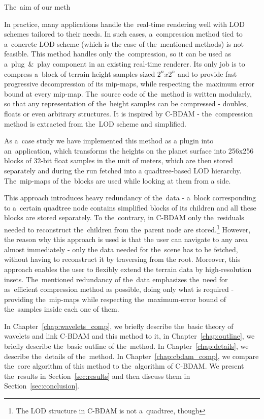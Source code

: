 The~aim of our meth

In practice, many applications handle the~real-time rendering well with LOD schemes tailored to their needs. In such cases, a~compression method tied to a~concrete LOD scheme (which is the case of the~mentioned methods) is not feasible. This method handles only the~compression, so it can be used as a~plug~\&~play component in an existing real-time renderer. Its only job is to compress a~block of terrain height samples sized $2^n x 2^n$ and to provide fast progressive decompression of its mip-maps, while respecting the~maximum error bound at every mip-map. The~source code of the~method is written modularly, so that any representation of the~height samples can be compressed - doubles, floats or even arbitrary structures. It is inspired by C-BDAM - the~compression method is extracted from the~LOD scheme and simplified.

As a~case study we have implemented this method as a plugin into an~application, which transforms the heights on the planet surface into 256x256 blocks of 32-bit float samples in the unit of meters, which are then stored separately and during the run fetched into a quadtree-based LOD hierarchy. The~mip-maps of the~blocks are used while looking at them from a side.

This approach introduces heavy redundancy of the~data - a~block corresponding to a~certain quadtree node contains simplified blocks of its children and all these blocks are stored separately. To the~contrary, in C-BDAM only the~residuals needed to reconstruct the~children from the~parent node are stored.\footnote{The LOD structure in C-BDAM is not a~quadtree, though} However, the reason why this approach is used is that the user can navigate to any area almost immediately - only the data needed for the~scene has to be fetched, without having to reconstruct it by traversing from the root. Moreover, this approach enables the user to flexibly extend the terrain data by high-resolution insets. The~mentioned redundancy of the~data emphasizes the~need for as~efficient compression method as possible, doing only what is required - providing the~mip-maps while respecting the~maximum-error bound of the~samples inside each one of them.

In Chapter~\ref{chap:wavelets_comp}, we briefly describe the~basic theory of wavelets and link C-BDAM and this method to it, in Chapter~\ref{chap:outline}, we briefly describe the~basic outline of the~method. In Chapter~\ref{chap:details}, we describe the~details of the~method. In Chapter~\ref{chap:cbdam_comp}, we compare the~core algorithm of this method to the~algorithm of C-BDAM. We present the~results in Section~\ref{sec:results} and then discuss them in Section~\ref{sec:conclusion}.
